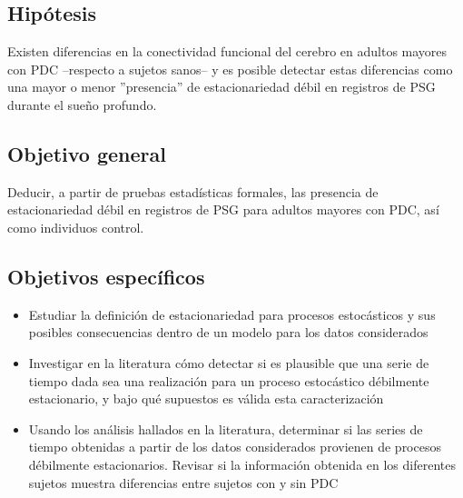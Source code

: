 \documentclass[12pt,a4paper]{mitthesis}
\begin{document}

\subsection{Hip\'otesis}

Existen diferencias en la conectividad funcional del cerebro en adultos mayores con PDC --respecto
a sujetos sanos-- y es posible detectar estas diferencias como una mayor o menor ''presencia'' de 
estacionariedad d\'ebil en registros de PSG durante el sue\~no profundo.


\subsection{Objetivo general}

Deducir, a partir de pruebas estad\'isticas formales, las presencia de estacionariedad d\'ebil en
registros de PSG para adultos mayores con PDC, as\'i como individuos control.


\subsection{Objetivos espec\'ificos}

\begin{itemize}
\item Estudiar la definici\'on de estacionariedad para procesos estoc\'asticos y sus posibles 
consecuencias dentro de un modelo para los datos considerados

\item Investigar en la literatura c\'omo detectar si es plausible que una serie de tiempo dada sea 
una realizaci\'on para un proceso estoc\'astico d\'ebilmente estacionario, y bajo qu\'e supuestos 
es v\'alida esta caracterizaci\'on

\item Usando los an\'alisis hallados en la literatura, determinar si las series de tiempo 
obtenidas a partir de los datos considerados provienen de procesos débilmente estacionarios.
Revisar si la informaci\'on obtenida en los diferentes sujetos muestra diferencias entre sujetos 
con y sin PDC
\end{itemize}
\end{document}
